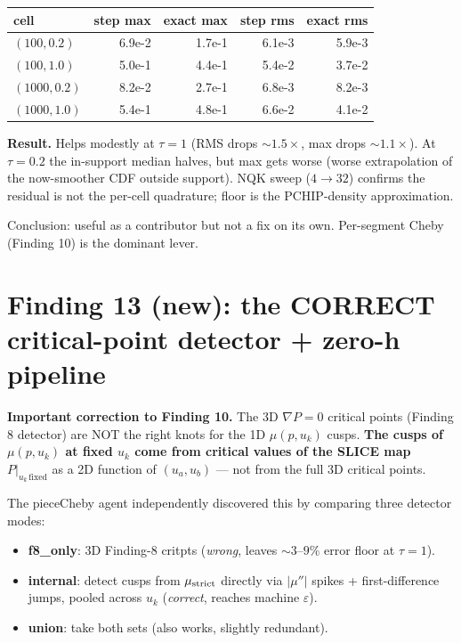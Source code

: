 \documentclass[11pt]{article}
\begin{document}
\begin{center}\begin{tabular}{lrrrr}\toprule
cell & step max & exact max & step rms & exact rms \\
\midrule
$(100, 0.2)$  & 6.9e-2 & 1.7e-1 & 6.1e-3 & 5.9e-3 \\
$(100, 1.0)$  & 5.0e-1 & 4.4e-1 & 5.4e-2 & 3.7e-2 \\
$(1000, 0.2)$ & 8.2e-2 & 2.7e-1 & 6.8e-3 & 8.2e-3 \\
$(1000, 1.0)$ & 5.4e-1 & 4.8e-1 & 6.6e-2 & 4.1e-2 \\
\bottomrule\end{tabular}\end{center}

\textbf{Result.} Helps modestly at $\tau = 1$ (RMS drops $\sim 1.5\times$,
max drops $\sim 1.1\times$). At $\tau = 0.2$ the in-support median
halves, but max gets worse (worse extrapolation of the now-smoother
CDF outside support). NQK sweep ($4 \to 32$) confirms the residual is
not the per-cell quadrature; floor is the PCHIP-density approximation.

Conclusion: useful as a contributor but not a fix on its own.
Per-segment Cheby (Finding 10) is the dominant lever.

\section{Finding 13 (new): the CORRECT critical-point detector + zero-h pipeline}

\textbf{Important correction to Finding 10.} The 3D ${\nabla P = 0}$
critical points (Finding 8 detector) are NOT the right knots for the 1D
$\mu(p, u_k)$ cusps. \textbf{The cusps of $\mu(p, u_k)$ at fixed $u_k$
come from critical values of the SLICE map} $P|_{u_k\,\text{fixed}}$ as
a 2D function of $(u_a, u_b)$ --- not from the full 3D critical points.

The pieceCheby agent independently discovered this by comparing three
detector modes:
\begin{itemize}\itemsep1pt
  \item \textbf{f8\_only}: 3D Finding-8 critpts (\emph{wrong}, leaves
        $\sim 3$--$9\%$ error floor at $\tau = 1$).
  \item \textbf{internal}: detect cusps from $\mu_{\rm strict}$ directly
        via $|\mu''|$ spikes + first-difference jumps, pooled across
        $u_k$ (\emph{correct}, reaches machine $\varepsilon$).
  \item \textbf{union}: take both sets (also works, slightly redundant).
\end{itemize}
\end{document}
